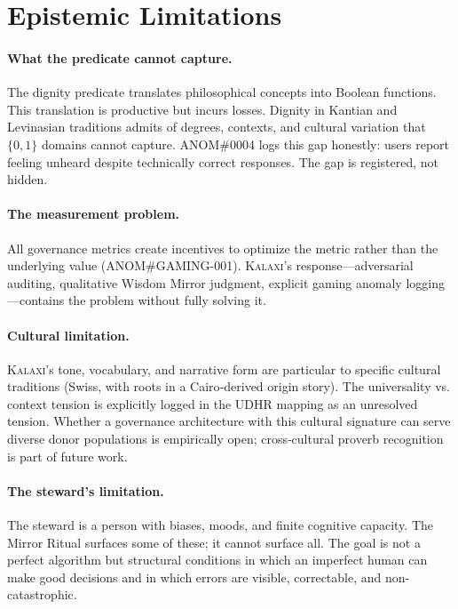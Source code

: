 \documentclass[12pt,a4paper]{article}
\theoremstyle{definition}
\theoremstyle{remark}
\newcommand{\kalaxi}{\textsc{Kalaxi}}
\begin{document}
\section{Epistemic Limitations}
\label{sec:limits}

\paragraph{What the predicate cannot capture.}
The dignity predicate translates philosophical concepts into Boolean functions.
This translation is productive but incurs losses. Dignity in Kantian and Levinasian
traditions admits of degrees, contexts, and cultural variation that $\{0,1\}$
domains cannot capture. ANOM\#0004 logs this gap honestly: users report feeling unheard
despite technically correct responses. The gap is registered, not hidden.

\paragraph{The measurement problem.}
All governance metrics create incentives to optimize the metric rather than the
underlying value (ANOM\#GAMING-001). \kalaxi{}'s response—adversarial auditing,
qualitative Wisdom Mirror judgment, explicit gaming anomaly logging—contains the
problem without fully solving it.

\paragraph{Cultural limitation.}
\kalaxi{}'s tone, vocabulary, and narrative form are particular to specific cultural
traditions (Swiss, with roots in a Cairo‑derived origin story). The universality
vs. context tension is explicitly logged in the UDHR mapping as an unresolved tension.
Whether a governance architecture with this cultural signature can serve diverse donor
populations is empirically open; cross‑cultural proverb recognition is part of future
work.

\paragraph{The steward's limitation.}
The steward is a person with biases, moods, and finite cognitive capacity. The Mirror
Ritual surfaces some of these; it cannot surface all. The goal is not a perfect
algorithm but structural conditions in which an imperfect human can make good
decisions and in which errors are visible, correctable, and non-catastrophic.
\end{document}
